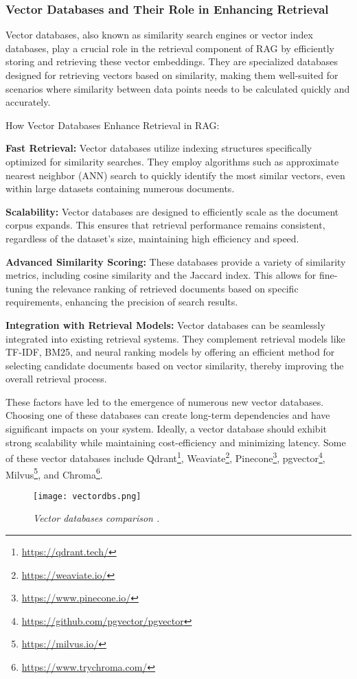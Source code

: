\subsubsection*{Vector Databases and Their Role in Enhancing Retrieval}

Vector databases, also known as similarity search engines or vector index databases, play a crucial role in the retrieval component of RAG by efficiently storing and retrieving these vector embeddings. They are specialized databases designed for retrieving vectors based on similarity, making them well-suited for scenarios where similarity between data points needs to be calculated quickly and accurately.

How Vector Databases Enhance Retrieval in RAG:

\textbf{Fast Retrieval:} Vector databases utilize indexing structures specifically optimized for similarity searches. They employ algorithms such as approximate nearest neighbor (ANN) search to quickly identify the most similar vectors, even within large datasets containing numerous documents.

\textbf{Scalability:} Vector databases are designed to efficiently scale as the document corpus expands. This ensures that retrieval performance remains consistent, regardless of the dataset's size, maintaining high efficiency and speed.

\textbf{Advanced Similarity Scoring:} These databases provide a variety of similarity metrics, including cosine similarity and the Jaccard index. This allows for fine-tuning the relevance ranking of retrieved documents based on specific requirements, enhancing the precision of search results.

\textbf{Integration with Retrieval Models:} Vector databases can be seamlessly integrated into existing retrieval systems. They complement retrieval models like TF-IDF, BM25, and neural ranking models by offering an efficient method for selecting candidate documents based on vector similarity, thereby improving the overall retrieval process.

These factors have led to the emergence of numerous new vector databases. Choosing one of these databases can create long-term dependencies and have significant impacts on your system. Ideally, a vector database should exhibit strong scalability while maintaining cost-efficiency and minimizing latency. Some of these vector databases include Qdrant\footnote{\url{https://qdrant.tech/}}, Weaviate\footnote{\url{https://weaviate.io/}}, Pinecone\footnote{\url{https://www.pinecone.io/}}, pgvector\footnote{\url{https://github.com/pgvector/pgvector}}, Milvus\footnote{\url{https://milvus.io/}}, and Chroma\footnote{\url{https://www.trychroma.com/}}.

\begin{figure}[H]
    \centering
    \texttt{[image: vectordbs.png]}
    \caption{
        \it{Vector databases comparison \cite{practicalrag}.}
    }
\end{figure}